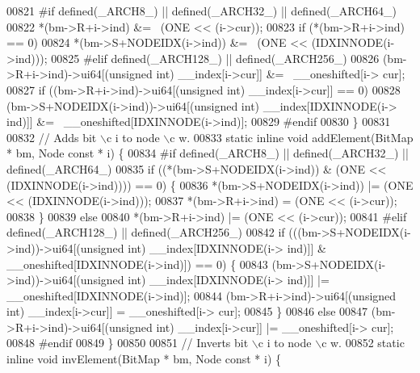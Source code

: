 \begin{DoxyCode}
00821 \textcolor{preprocessor}{#if defined(\_ARCH8\_) || defined(\_ARCH32\_) || defined(\_ARCH64\_)}
00822         *(bm->R+i->ind) &= ~(ONE << (i->cur));
00823         \textcolor{keywordflow}{if} (*(bm->R+i->ind) == 0)
00824                 *(bm->S+NODEIDX(i->ind)) &= ~(ONE << (IDXINNODE(i->ind)));
00825 \textcolor{preprocessor}{#elif defined(\_ARCH128\_) || defined(\_ARCH256\_)}
00826         (bm->R+i->ind)->ui64[(\textcolor{keywordtype}{unsigned} \textcolor{keywordtype}{int}) \_\_index[i->cur]] &= ~\_\_oneshifted[i->
      cur];
00827         \textcolor{keywordflow}{if} ((bm->R+i->ind)->ui64[(\textcolor{keywordtype}{unsigned} int) \_\_index[i->cur]] == 0)
00828                 (bm->S+NODEIDX(i->ind))->ui64[(\textcolor{keywordtype}{unsigned} \textcolor{keywordtype}{int}) \_\_index[IDXINNODE(i->
      ind)]] &= ~\_\_oneshifted[IDXINNODE(i->ind)];
00829 \textcolor{preprocessor}{#endif}
00830 \}
00831 
00832 \textcolor{comment}{// Adds bit \(\backslash\)c i to node \(\backslash\)c w.}
00833 \textcolor{keyword}{static} \textcolor{keyword}{inline} \textcolor{keywordtype}{void} addElement(BitMap * bm, Node \textcolor{keyword}{const} * i) \{
00834 \textcolor{preprocessor}{#if defined(\_ARCH8\_) || defined(\_ARCH32\_) || defined(\_ARCH64\_)}
00835         \textcolor{keywordflow}{if} ((*(bm->S+NODEIDX(i->ind)) & (ONE << (IDXINNODE(i->ind)))) == 0) \{
00836                 *(bm->S+NODEIDX(i->ind)) |= (ONE << (IDXINNODE(i->ind)));
00837                 *(bm->R+i->ind) = (ONE << (i->cur));
00838         \}
00839         \textcolor{keywordflow}{else}
00840                 *(bm->R+i->ind) |= (ONE << (i->cur));
00841 \textcolor{preprocessor}{#elif defined(\_ARCH128\_) || defined(\_ARCH256\_)}
00842         \textcolor{keywordflow}{if} (((bm->S+NODEIDX(i->ind))->ui64[(\textcolor{keywordtype}{unsigned} \textcolor{keywordtype}{int}) \_\_index[IDXINNODE(i->
      ind)]] & \_\_oneshifted[IDXINNODE(i->ind)]) == 0) \{
00843                 (bm->S+NODEIDX(i->ind))->ui64[(\textcolor{keywordtype}{unsigned} \textcolor{keywordtype}{int}) \_\_index[IDXINNODE(i->
      ind)]] |= \_\_oneshifted[IDXINNODE(i->ind)];
00844                 (bm->R+i->ind)->ui64[(\textcolor{keywordtype}{unsigned} \textcolor{keywordtype}{int}) \_\_index[i->cur]] = \_\_oneshifted[i->
      cur];
00845         \}
00846         \textcolor{keywordflow}{else}
00847                 (bm->R+i->ind)->ui64[(\textcolor{keywordtype}{unsigned} int) \_\_index[i->cur]] |= \_\_oneshifted[i->
      cur];
00848 #endif
00849 \}
00850 
00851 \textcolor{comment}{// Inverts bit \(\backslash\)c i to node \(\backslash\)c w.}
00852 \textcolor{keyword}{static} \textcolor{keyword}{inline} \textcolor{keywordtype}{void} invElement(BitMap * bm, Node \textcolor{keyword}{const} * i) \{

\end{DoxyCode}
